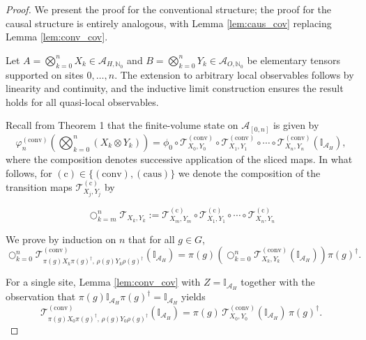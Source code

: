 \documentclass[12pt,a4paper]{article}
\begin{document}
\begin{proof}
We present the proof for the conventional structure; the proof for the causal structure is entirely analogous, with Lemma \ref{lem:caus_cov} replacing Lemma \ref{lem:conv_cov}.

Let \(A = \bigotimes_{k=0}^n X_k \in \mathcal{A}_{H,\mathbb{N}_0}\) and \(B = \bigotimes_{k=0}^n Y_k \in \mathcal{A}_{O,\mathbb{N}_0}\) be elementary tensors supported on sites \(0, \dots, n\). The extension to arbitrary local observables follows by linearity and continuity, and the inductive limit construction ensures the result holds for all quasi-local observables.

Recall from Theorem 1 that the finite-volume state on \(\mathcal{A}_{[0,n]}\) is given by
\begin{equation}
\varphi_n^{(\text{conv})}\!\left( \bigotimes_{k=0}^n (X_k \otimes Y_k) \right) = \phi_0 \circ \mathcal{T}_{X_0,Y_0}^{(\text{conv})} \circ \mathcal{T}_{X_1,Y_1}^{(\text{conv})} \circ \cdots \circ \mathcal{T}_{X_n,Y_n}^{(\text{conv})}(\mathbb{I}_{\mathcal{A}_H}),
\label{eq:finite_volume_conv}
\end{equation}
where the composition denotes successive application of the sliced maps. In what follows, for $(\text{c})\in \{(\text{conv}), (\text{caus}) \}$  we denote the composition of the transition  maps $\mathcal{T}^{(\text{c})} _{X_j,Y_j}$ by

$$
\bigcirc_{k=m}^n \mathcal{T}_{X_k, Y_k} := \mathcal{T}_{X_m,Y_m}^{(\text{c})} \circ \mathcal{T}_{X_1,Y_1}^{(\text{c})} \circ \cdots \circ \mathcal{T}_{X_n,Y_n}^{(\text{c})}
$$

We prove by induction on \(n\) that for all \(g \in G\),
\begin{equation}
\bigcirc_{k=0}^n \mathcal{T}_{\pi(g) X_k \pi(g)^\dagger, \, \rho(g) Y_k \rho(g)^\dagger}^{(\text{conv})}(\mathbb{I}_{\mathcal{A}_H})
= \pi(g) \left( \bigcirc_{k=0}^n \mathcal{T}_{X_k,Y_k}^{(\text{conv})}(\mathbb{I}_{\mathcal{A}_H}) \right) \pi(g)^\dagger.
\label{eq:induction_claim}
\end{equation}


For a single site, Lemma \ref{lem:conv_cov} with \(Z = \mathbb{I}_{\mathcal{A}_H}\) together with the observation that \(\pi(g) \mathbb{I}_{\mathcal{A}_H} \pi(g)^\dagger = \mathbb{I}_{\mathcal{A}_H}\) yields
\[
\mathcal{T}_{\pi(g) X_0 \pi(g)^\dagger, \, \rho(g) Y_0 \rho(g)^\dagger}^{(\text{conv})}(\mathbb{I}_{\mathcal{A}_H})
= \pi(g) \, \mathcal{T}_{X_0,Y_0}^{(\text{conv})}(\mathbb{I}_{\mathcal{A}_H}) \, \pi(g)^\dagger.
\]



\end{proof}
\end{document}
